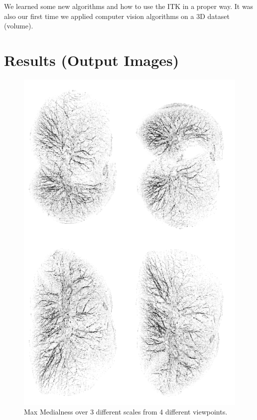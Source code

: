 We learned some new algorithms and how to use the ITK in a proper way.
It was also our first time we applied computer vision algorithms on a 3D dataset (volume).


\newpage


\section{Results (Output Images)}

\begin{figure}[h!]
 \centering
 \includegraphics[width=14.5cm,keepaspectratio=true]{./figures/max-white.png}
 \caption{Max Medialness over 3 different scales from 4 different viewpoints.}
 \label{fig:max}
\end{figure}


